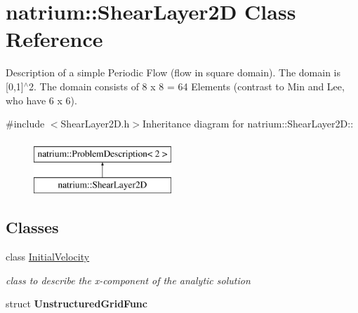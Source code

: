 \hypertarget{classnatrium_1_1ShearLayer2D}{
\section{natrium::ShearLayer2D Class Reference}
\label{classnatrium_1_1ShearLayer2D}
}


Description of a simple Periodic Flow (flow in square domain). The domain is \mbox{[}0,1\mbox{]}$^\wedge$2. The domain consists of 8 x 8 = 64 Elements (contrast to Min and Lee, who have 6 x 6).  


{\ttfamily \#include $<$ShearLayer2D.h$>$}Inheritance diagram for natrium::ShearLayer2D::\begin{figure}[H]
\begin{center}
\leavevmode
\includegraphics[height=2cm]{classnatrium_1_1ShearLayer2D}
\end{center}
\end{figure}
\subsection*{Classes}
\begin{DoxyCompactItemize}
\item 
class \hyperlink{classnatrium_1_1ShearLayer2D_1_1InitialVelocity}{InitialVelocity}
\begin{DoxyCompactList}\small\item\em class to describe the x-\/component of the analytic solution \item\end{DoxyCompactList}\item 
struct {\bfseries UnstructuredGridFunc}
\end{DoxyCompactItemize}
